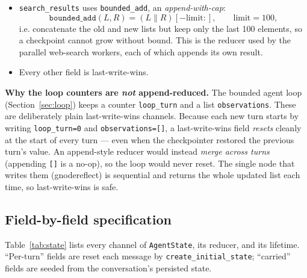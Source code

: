 \documentclass[11pt,a4paper]{article}
\newcommand{\code}[1]{\texttt{\small #1}}
\begin{document}
\begin{itemize}[leftmargin=1.4em]
  \item \code{search\_results} uses \code{bounded\_add}, an \emph{append-with-cap}:
  \[
    \texttt{bounded\_add}(L,R) = (L \mathbin{\|} R)[-\text{limit}:],
    \qquad \text{limit}=100,
  \]
  i.e. concatenate the old and new lists but keep only the last 100 elements, so a
  checkpoint cannot grow without bound. This is the reducer used by the parallel
  web-search workers, each of which appends its own result.
  \item Every other field is last-write-wins.
\end{itemize}

\begin{intuition}
\textbf{Why the loop counters are \emph{not} append-reduced.} The bounded agent loop
(Section~\ref{sec:loop}) keeps a counter \code{loop\_turn} and a list
\code{observations}. These are deliberately plain last-write-wins channels. Because
each new turn starts by writing \code{loop\_turn=0} and \code{observations=[]}, a
last-write-wins field \emph{resets} cleanly at the start of every turn --- even when
the checkpointer restored the previous turn's value. An append-style reducer would
instead \emph{merge across turns} (appending \code{[]} is a no-op), so the loop
would never reset. The single node that writes them (gnode{reflect}) is sequential
and returns the whole updated list each time, so last-write-wins is safe.
\end{intuition}

\subsection{Field-by-field specification}
Table~\ref{tab:state} lists every channel of \code{AgentState}, its reducer, and its
lifetime. ``Per-turn'' fields are reset each message by \code{create\_initial\_state};
``carried'' fields are seeded from the conversation's persisted state.
\end{document}
